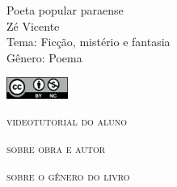 \documentclass[smaller,professionalfonts,15pt]{beamer}
\begin{document}
										\begin{frame}\begin{raggedleft}
										\Huge 
Poeta popular paraense						\\
										\huge 
Zé Vicente							\\
										\bigskip
										\normalsize
Tema: Ficção, mistério e fantasia		\\	
Gênero: Poema			\\\vfill\hfill

										\end{raggedleft}

\smallskip\hfill\includegraphics[width=2cm]{ccbync.png}
\end{frame}


\begin{frame}{\textsc{videotutorial do aluno}}
\vspace{-2cm}\begin{figure}
\end{figure}
\end{frame}



\begin{frame}
\hfill\Huge
\textsc{sobre obra e autor}
\end{frame}

\begin{frame}
\hfill\Huge
\textsc{sobre o gênero do livro}
\end{frame}
\end{document}
